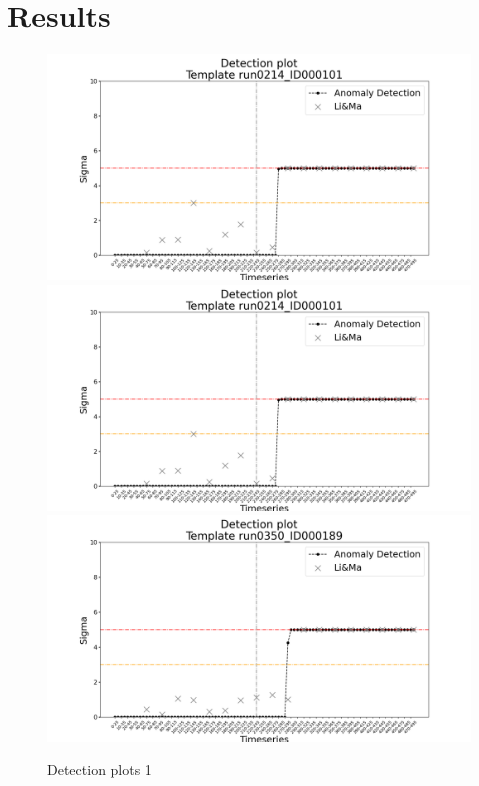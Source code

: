 
\section{Results}
\label{s:appendix-c}


\begin{figure}[!htb]
    
    \includegraphics[width=1\textwidth]{figures/experiments/detection_plots/detection_plot_run0214_ID000101_testset_e.png}\hfill
    \\[\smallskipamount]
    
    \includegraphics[width=1\textwidth]{figures/experiments/detection_plots/detection_plot_run0214_ID000101_testset_e.png}\hfill
    \\[\smallskipamount]

    \includegraphics[width=1\textwidth]{figures/experiments/detection_plots/detection_plot_run0350_ID000189_testset_e.png}\hfill
    \\[\smallskipamount]

    \caption{Detection plots 1}\label{fig:detection-plots-1}
\end{figure}


